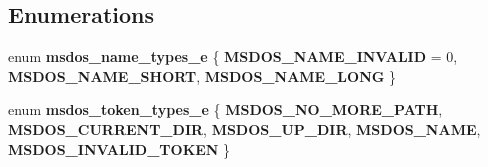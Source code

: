 \subsection*{Enumerations}
\begin{DoxyCompactItemize}
\item 
\mbox{\label{group__libfs__msdos_gae7b955639ba78aeac356ca8803ad79f8}} 
enum {\bfseries msdos\+\_\+name\+\_\+types\+\_\+e} \{ {\bfseries M\+S\+D\+O\+S\+\_\+\+N\+A\+M\+E\+\_\+\+I\+N\+V\+A\+L\+ID} = 0, 
{\bfseries M\+S\+D\+O\+S\+\_\+\+N\+A\+M\+E\+\_\+\+S\+H\+O\+RT}, 
{\bfseries M\+S\+D\+O\+S\+\_\+\+N\+A\+M\+E\+\_\+\+L\+O\+NG}
 \}
\item 
\mbox{\label{group__libfs__msdos_ga1441e21e71f31da23d0edfc63609251c}} 
enum {\bfseries msdos\+\_\+token\+\_\+types\+\_\+e} \{ \newline
{\bfseries M\+S\+D\+O\+S\+\_\+\+N\+O\+\_\+\+M\+O\+R\+E\+\_\+\+P\+A\+TH}, 
{\bfseries M\+S\+D\+O\+S\+\_\+\+C\+U\+R\+R\+E\+N\+T\+\_\+\+D\+IR}, 
{\bfseries M\+S\+D\+O\+S\+\_\+\+U\+P\+\_\+\+D\+IR}, 
{\bfseries M\+S\+D\+O\+S\+\_\+\+N\+A\+ME}, 
\newline
{\bfseries M\+S\+D\+O\+S\+\_\+\+I\+N\+V\+A\+L\+I\+D\+\_\+\+T\+O\+K\+EN}
 \}
\end{DoxyCompactItemize}
